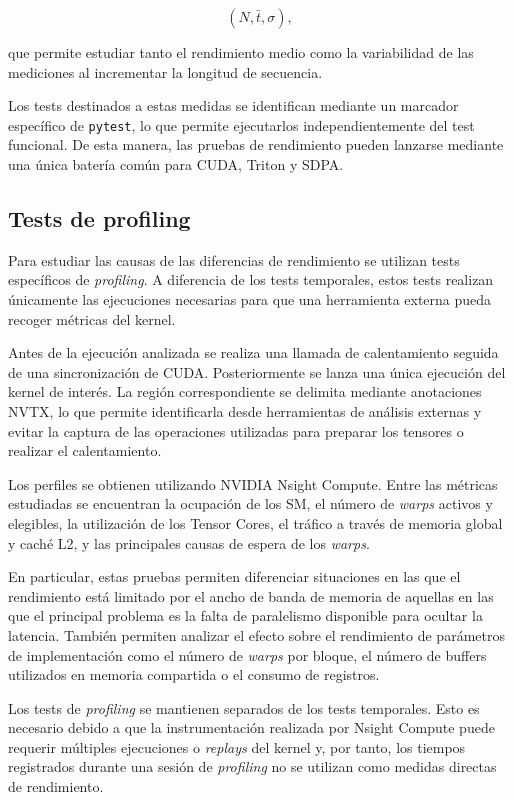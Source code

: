 $$
(N,\bar{t},\sigma),
$$

que permite estudiar tanto el rendimiento medio como la variabilidad de las mediciones al incrementar la longitud de secuencia.

Los tests destinados a estas medidas se identifican mediante un marcador específico de \texttt{pytest}, lo que permite ejecutarlos independientemente del test funcional. De esta manera, las pruebas de rendimiento pueden lanzarse mediante una única batería común para CUDA, Triton y SDPA.

\subsection{Tests de profiling}

Para estudiar las causas de las diferencias de rendimiento se utilizan tests específicos de \textit{profiling}. A diferencia de los tests temporales, estos tests realizan únicamente las ejecuciones necesarias para que una herramienta externa pueda recoger métricas del kernel.

Antes de la ejecución analizada se realiza una llamada de calentamiento seguida de una sincronización de CUDA. Posteriormente se lanza una única ejecución del kernel de interés. La región correspondiente se delimita mediante anotaciones NVTX, lo que permite identificarla desde herramientas de análisis externas y evitar la captura de las operaciones utilizadas para preparar los tensores o realizar el calentamiento.

Los perfiles se obtienen utilizando NVIDIA Nsight Compute. Entre las métricas estudiadas se encuentran la ocupación de los SM, el número de \textit{warps} activos y elegibles, la utilización de los Tensor Cores, el tráfico a través de memoria global y caché L2, y las principales causas de espera de los \textit{warps}.

En particular, estas pruebas permiten diferenciar situaciones en las que el rendimiento está limitado por el ancho de banda de memoria de aquellas en las que el principal problema es la falta de paralelismo disponible para ocultar la latencia. También permiten analizar el efecto sobre el rendimiento de parámetros de implementación como el número de \textit{warps} por bloque, el número de buffers utilizados en memoria compartida o el consumo de registros.

Los tests de \textit{profiling} se mantienen separados de los tests temporales. Esto es necesario debido a que la instrumentación realizada por Nsight Compute puede requerir múltiples ejecuciones o \textit{replays} del kernel y, por tanto, los tiempos registrados durante una sesión de \textit{profiling} no se utilizan como medidas directas de rendimiento.


